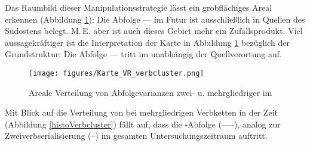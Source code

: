     


      
Das Raumbild dieser Manipulationsstrategie lässt ein grobflächiges Areal erkennen (Abbildung \ref{KarteVerbcluster}): Die Abfolge –– im Futur ist ausschließlich in Quellen des Südostens belegt. M.\,E. aber ist auch dieses Gebiet mehr ein Zufallsprodukt. Viel aussagekräftiger ist die Interpretation der Karte in Abbildung \ref{KarteVerbcluster} bezüglich der Grundstruktur: Die Abfolge –– tritt im  unabhängig der Quellverortung auf. 


\begin{figure}
\centering
\texttt{[image: figures/Karte\_VR\_verbcluster.png]}
		\caption{\label{KarteVerbcluster} Areale Verteilung von Abfolgevarianzen zwei- u. mehrgliedriger  im }
	\end{figure}
 
 
Mit Blick auf die Verteilung von \hai{{\VR}} bei mehrgliedrigen Verbketten in der Zeit (Abbildung \ref{histoVerbcluster}) fällt auf, dass die \hai{{\VO}}-Abfolge (–––), analog zur Zweiverbserialisierung (–) im gesamten Untersuchungszeitraum auftritt. 
     
